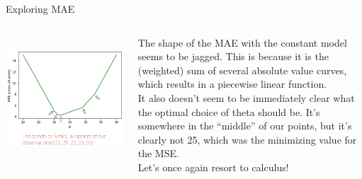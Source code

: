 \documentclass[aspectratio=169]{../latex_main/tntbeamer}  %
\begin{document}
	
	\begin{frame}{Exploring MAE}
	    \begin{columns}
	        \begin{column}{.5\textwidth}
	                \\
	                \includegraphics[scale=.4]{Bild38}
	        \end{column}
	        
	        
	        \begin{column}{.5\textwidth}
	                The shape of the MAE with the constant model seems to be jagged. This is because it is the (weighted) sum of several absolute value curves, which results in a piecewise linear function. \\
                    It also doesn’t seem to be immediately clear what the optimal choice of theta should be. It’s somewhere in the “middle” of our points, but it’s clearly not 25, which was the minimizing value for the MSE. \\
                    Let’s once again resort to calculus!
	        \end{column}
	    \end{columns}
	\end{frame}
	
\end{document}
